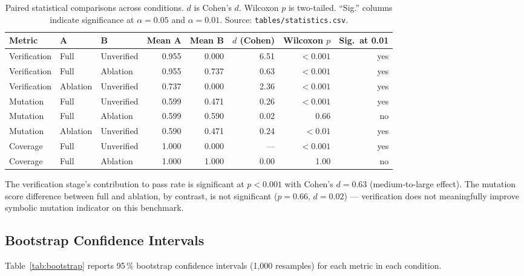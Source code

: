 \documentclass[10pt,twocolumn,letterpaper]{article}
\begin{document}
\begin{table}[t]
\centering
\caption{Paired statistical comparisons across conditions. $d$ is
Cohen's $d$. Wilcoxon $p$ is two-tailed. ``Sig.'' columns indicate
significance at $\alpha = 0.05$ and $\alpha = 0.01$.
Source: \texttt{tables/statistics.csv}.}
\label{tab:stats}
\small
\begin{tabular}{lllrrrrr}
\toprule
Metric        & A        & B          & Mean A & Mean B & $d$ (Cohen) & Wilcoxon $p$ & Sig.\ at 0.01 \\
\midrule
Verification  & Full     & Unverified & 0.955  & 0.000  & 6.51        & $<0.001$    & yes \\
Verification  & Full     & Ablation   & 0.955  & 0.737  & 0.63        & $<0.001$    & yes \\
Verification  & Ablation & Unverified & 0.737  & 0.000  & 2.36        & $<0.001$    & yes \\
Mutation      & Full     & Unverified & 0.599  & 0.471  & 0.26        & $<0.001$    & yes \\
Mutation      & Full     & Ablation   & 0.599  & 0.590  & 0.02        & 0.66        & no  \\
Mutation      & Ablation & Unverified & 0.590  & 0.471  & 0.24        & $<0.01$     & yes \\
Coverage      & Full     & Unverified & 1.000  & 0.000  & ---         & $<0.001$    & yes \\
Coverage      & Full     & Ablation   & 1.000  & 1.000  & 0.00        & 1.00        & no  \\
\bottomrule
\end{tabular}
\end{table}

The verification stage's contribution to pass rate is significant at
$p < 0.001$ with Cohen's $d = 0.63$ (medium-to-large effect). The
mutation score difference between full and ablation, by contrast, is
not significant ($p = 0.66$, $d = 0.02$) — verification does not
meaningfully improve symbolic mutation indicator on this benchmark.

\subsection{Bootstrap Confidence Intervals}
\label{sec:bootstrap}

Table~\ref{tab:bootstrap} reports 95\,\% bootstrap confidence
intervals (1{,}000 resamples) for each metric in each condition.
\end{document}
